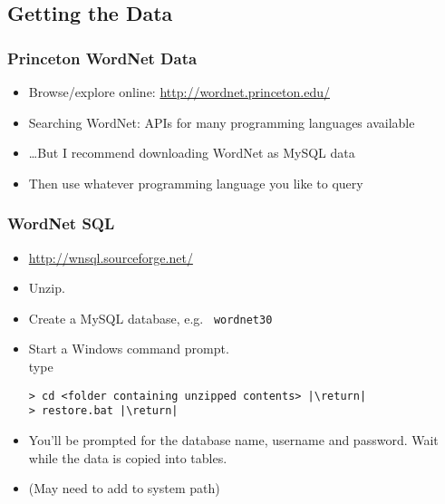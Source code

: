 \subsection{Getting the Data}

\begin{frame}
\frametitle{Princeton WordNet Data}
    
\begin{itemize}[<+->]
\item Browse/explore online: \url{http://wordnet.princeton.edu/}
\item Searching WordNet: APIs for many programming languages available
\item \ldots But I recommend downloading WordNet as MySQL data
\item Then use whatever programming language you like to query
\end{itemize}

\end{frame}


\begin{frame}[fragile]
\frametitle{WordNet SQL}
    
\begin{itemize}
\item \url{http://wnsql.sourceforge.net/}
\item {} Unzip. 
\item Create a MySQL database, e.g.~ \texttt{wordnet30}
\item Start a Windows command prompt.\\ type  \return

\begin{lstlisting}[backgroundcolor=\color{black},basicstyle=\ttfamily\color{green}, 
escapechar=|, framexleftmargin=1em, xleftmargin=1em]
> cd <folder containing unzipped contents> |\return|
> restore.bat |\return|
\end{lstlisting}

\item You'll be prompted for the database name, username and password. Wait while the data is copied into tables.

\item (May need to add  to system path)
\end{itemize}

\end{frame}




